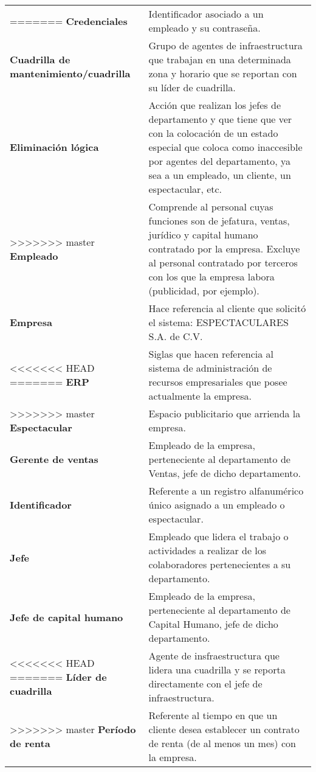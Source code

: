 \begin{longtable}[H]{m{4cm}m{8cm}}
=======
\textbf{Credenciales} & Identificador asociado a un empleado y su contraseña. \tabularnewline

\textbf{Cuadrilla de mantenimiento/cuadrilla} & Grupo de agentes de infraestructura que trabajan en una determinada zona y horario que se reportan con su líder de cuadrilla. \tabularnewline


\textbf{Eliminación lógica} & Acción que realizan los jefes de departamento y que tiene que ver con la colocación de un estado especial que coloca como inaccesible por agentes del departamento, ya sea a un empleado, un cliente, un espectacular, etc. \tabularnewline

>>>>>>> master
\textbf{Empleado} &  Comprende al personal cuyas funciones son de jefatura, ventas, jurídico y capital humano contratado por la empresa. Excluye al personal contratado por terceros con los que la empresa labora (publicidad, por ejemplo).\tabularnewline

\textbf{Empresa} & Hace referencia al cliente que solicitó el sistema: ESPECTACULARES S.A. de C.V.\tabularnewline

<<<<<<< HEAD
=======
\textbf{ERP} & Siglas que hacen referencia al sistema de administración de recursos empresariales que posee actualmente la empresa. \tabularnewline

>>>>>>> master
\textbf{Espectacular} & Espacio publicitario que arrienda la empresa. \tabularnewline

\textbf{Gerente de ventas} & Empleado de la empresa, perteneciente al departamento de Ventas, jefe de dicho departamento. \tabularnewline

\textbf{Identificador} & Referente a un registro alfanumérico único asignado a un empleado o espectacular. \tabularnewline

\textbf{Jefe} & Empleado que lidera el trabajo o actividades a realizar de los colaboradores pertenecientes a su departamento. \tabularnewline

\textbf{Jefe de capital humano} & Empleado de la empresa, perteneciente al departamento de Capital Humano, jefe de dicho departamento. \tabularnewline

<<<<<<< HEAD
=======
\textbf{Líder de cuadrilla} & Agente de insfraestructura que lidera una cuadrilla y se reporta directamente con el jefe de infraestructura. \tabularnewline

>>>>>>> master
\textbf{Período de renta} & Referente al tiempo en que un cliente desea establecer un contrato de renta (de al menos un mes) con la empresa. \tabularnewline


\end{longtable}
